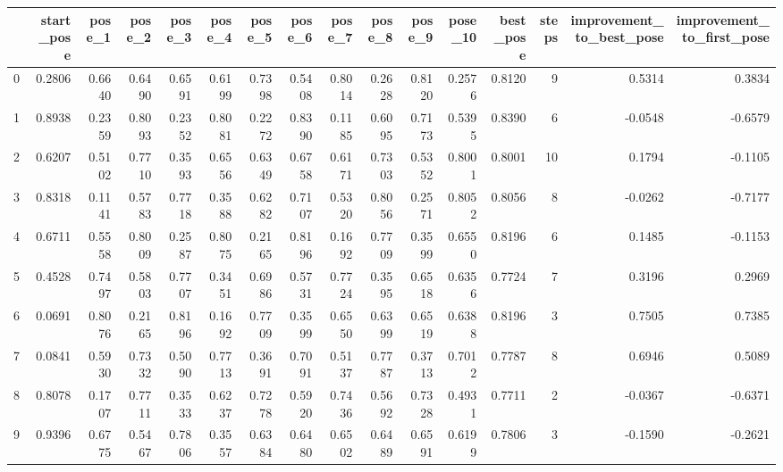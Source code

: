 \begin{tabular}{lrrrrrrrrrrrrrrr}
\toprule
{} &  start\_pose &  pose\_1 &  pose\_2 &  pose\_3 &  pose\_4 &  pose\_5 &  pose\_6 &  pose\_7 &  pose\_8 &  pose\_9 &  pose\_10 &  best\_pose &  steps &  improvement\_to\_best\_pose &  improvement\_to\_first\_pose \\
\midrule
0   &      0.2806 &  0.6640 &  0.6490 &  0.6591 &  0.6199 &  0.7398 &  0.5408 &  0.8014 &  0.2628 &  0.8120 &   0.2576 &     0.8120 &      9 &                    0.5314 &                     0.3834 \\
1   &      0.8938 &  0.2359 &  0.8093 &  0.2352 &  0.8081 &  0.2272 &  0.8390 &  0.1185 &  0.6095 &  0.7173 &   0.5395 &     0.8390 &      6 &                   -0.0548 &                    -0.6579 \\
2   &      0.6207 &  0.5102 &  0.7710 &  0.3593 &  0.6556 &  0.6349 &  0.6758 &  0.6171 &  0.7303 &  0.5352 &   0.8001 &     0.8001 &     10 &                    0.1794 &                    -0.1105 \\
3   &      0.8318 &  0.1141 &  0.5783 &  0.7718 &  0.3588 &  0.6282 &  0.7107 &  0.5320 &  0.8056 &  0.2571 &   0.8052 &     0.8056 &      8 &                   -0.0262 &                    -0.7177 \\
4   &      0.6711 &  0.5558 &  0.8009 &  0.2587 &  0.8075 &  0.2165 &  0.8196 &  0.1692 &  0.7709 &  0.3599 &   0.6550 &     0.8196 &      6 &                    0.1485 &                    -0.1153 \\
5   &      0.4528 &  0.7497 &  0.5803 &  0.7707 &  0.3451 &  0.6986 &  0.5731 &  0.7724 &  0.3595 &  0.6518 &   0.6356 &     0.7724 &      7 &                    0.3196 &                     0.2969 \\
6   &      0.0691 &  0.8076 &  0.2165 &  0.8196 &  0.1692 &  0.7709 &  0.3599 &  0.6550 &  0.6399 &  0.6519 &   0.6388 &     0.8196 &      3 &                    0.7505 &                     0.7385 \\
7   &      0.0841 &  0.5930 &  0.7332 &  0.5090 &  0.7713 &  0.3691 &  0.7091 &  0.5137 &  0.7787 &  0.3713 &   0.7012 &     0.7787 &      8 &                    0.6946 &                     0.5089 \\
8   &      0.8078 &  0.1707 &  0.7711 &  0.3533 &  0.6237 &  0.7278 &  0.5920 &  0.7436 &  0.5692 &  0.7328 &   0.4931 &     0.7711 &      2 &                   -0.0367 &                    -0.6371 \\
9   &      0.9396 &  0.6775 &  0.5467 &  0.7806 &  0.3557 &  0.6384 &  0.6480 &  0.6502 &  0.6489 &  0.6591 &   0.6199 &     0.7806 &      3 &                   -0.1590 &                    -0.2621 \\

\end{tabular}
